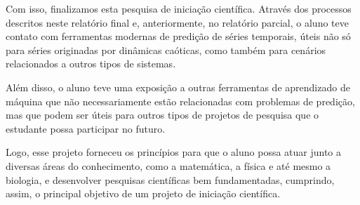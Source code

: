 \documentclass[a4paper, 12pt]{article}
\begin{document}
Com isso, finalizamos esta pesquisa de iniciação científica. Através dos processos descritos neste relatório final e, anteriormente, no relatório parcial, o aluno teve contato com ferramentas modernas de predição de séries temporais, úteis não só para séries originadas por dinâmicas caóticas, como também para cenários relacionados a outros tipos de sistemas.

Além disso, o aluno teve uma exposição a outras ferramentas de aprendizado de máquina que não necessariamente estão relacionadas com problemas de predição, mas que podem ser úteis para outros tipos de projetos de pesquisa que o estudante possa participar no futuro.

Logo, esse projeto forneceu os princípios para que o aluno possa atuar junto a diversas áreas do conhecimento, como a matemática, a física e até mesmo a biologia, e desenvolver pesquisas científicas bem fundamentadas, cumprindo, assim, o principal objetivo de um projeto de iniciação científica.




{\footnotesize }

\end{document}
